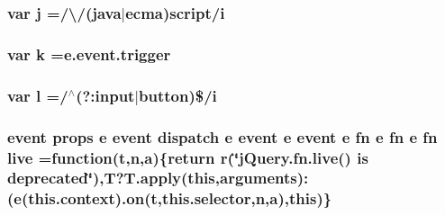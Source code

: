 \subsubsection[{j}]{\setlength{\rightskip}{0pt plus 5cm}var j =/\textbackslash{}/(java$\vert$ecma)script/{\bf i}}\label{jquery-migrate-1_82_81_8min_8js_aab858032a95af802114b255fac6f45f2}
\hypertarget{jquery-migrate-1_82_81_8min_8js_ab26645c014aa005ecedef329ecf58c99}{}
\subsubsection[{k}]{\setlength{\rightskip}{0pt plus 5cm}var k ={\bf e.\+event.\+trigger}}\label{jquery-migrate-1_82_81_8min_8js_ab26645c014aa005ecedef329ecf58c99}
\hypertarget{jquery-migrate-1_82_81_8min_8js_ae5e71a2600e8891c54854be157cc6626}{}
\subsubsection[{l}]{\setlength{\rightskip}{0pt plus 5cm}var l =/$^\wedge$(?\+:input$\vert${\bf button})\$/{\bf i}}\label{jquery-migrate-1_82_81_8min_8js_ae5e71a2600e8891c54854be157cc6626}
\hypertarget{jquery-migrate-1_82_81_8min_8js_aa6c79bc1b67b68a78848ce440dbedd68}{}
\subsubsection[{live}]{ {\bf event} props {\bf e} {\bf event} {\bf dispatch} {\bf e} {\bf event} {\bf e} {\bf event} {\bf e} {\bf fn} {\bf e} {\bf fn} {\bf e} {\bf fn} live =function({\bf t},{\bf n},{\bf a})\{return {\bf r}(\char`\"{}j\+Query.\+fn.\+live() is deprecated\char`\"{}),T?T.\+apply({\bf this},arguments)\+:({\bf e}(this.\+context).{\bf on}({\bf t},this.\+selector,{\bf n},{\bf a}),{\bf this})\}}\label{jquery-migrate-1_82_81_8min_8js_aa6c79bc1b67b68a78848ce440dbedd68}
\hypertarget{jquery-migrate-1_82_81_8min_8js_af33e4fb80081524297d84c89540aeaca}{}
